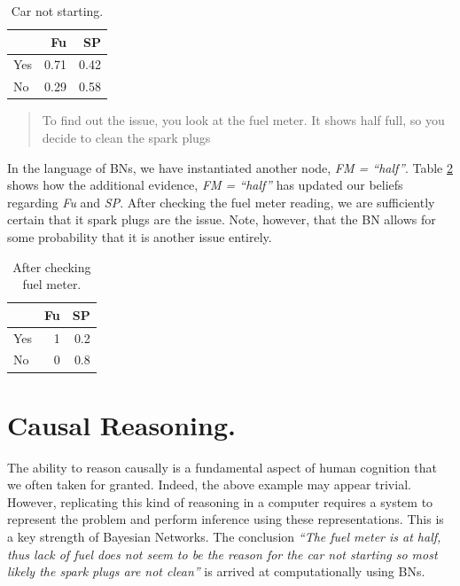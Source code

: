 \documentclass[twocol]{ametsoc}
\begin{document}
\begin{table}

\caption{\label{tab:tab4}Car not starting.}
\centering
\begin{tabular}[t]{l|r|r}
\hline
  & Fu & SP\\
\hline
Yes & 0.71 & 0.42\\
\hline
No & 0.29 & 0.58\\
\hline
\end{tabular}
\end{table}

\begin{quote}
To find out the issue, you look at the fuel meter. It shows half full,
so you decide to clean the spark plugs
\end{quote}

In the language of BNs, we have instantiated another node, \emph{FM =
``half''}. Table \ref{tab:tab5} shows how the additional evidence,
\emph{FM = ``half''} has updated our beliefs regarding \emph{Fu} and
\emph{SP}. After checking the fuel meter reading, we are sufficiently
certain that it spark plugs are the issue. Note, however, that the BN
allows for some probability that it is another issue entirely.

\begin{table}

\caption{\label{tab:tab5}After checking fuel meter.}
\centering
\begin{tabular}[t]{l|r|r}
\hline
  & Fu & SP\\
\hline
Yes & 1 & 0.2\\
\hline
No & 0 & 0.8\\
\hline
\end{tabular}
\end{table}

\hypertarget{causal-reasoning.}{%
\section{Causal Reasoning.}\label{causal-reasoning.}}

The ability to reason causally is a fundamental aspect of human
cognition that we often taken for granted. Indeed, the above example may
appear trivial. However, replicating this kind of reasoning in a
computer requires a system to represent the problem and perform
inference using these representations. This is a key strength of
Bayesian Networks. The conclusion \emph{``The fuel meter is at half,
thus lack of fuel does not seem to be the reason for the car not
starting so most likely the spark plugs are not clean''} is arrived at
computationally using BNs.
\end{document}
